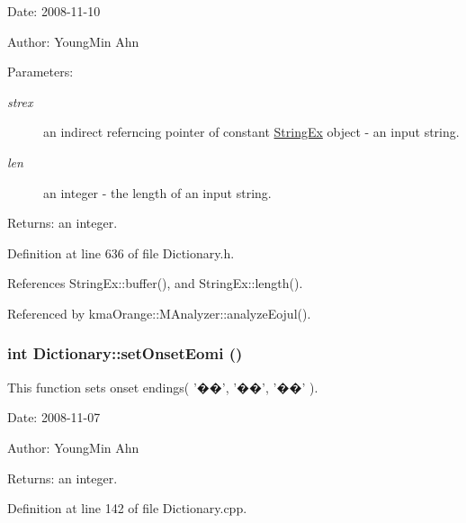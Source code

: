 \begin{Desc}
\item[Date:]2008-11-10 \end{Desc}
\begin{Desc}
\item[Author:]YoungMin Ahn \end{Desc}
\begin{Desc}
\item[Parameters:]
\begin{description}
\item[{\em strex}]an indirect referncing pointer of constant \hyperlink{classStringEx}{StringEx} object - an input string. \item[{\em len}]an integer - the length of an input string. \end{description}
\end{Desc}
\begin{Desc}
\item[Returns:]an integer. \end{Desc}


Definition at line 636 of file Dictionary.h.

References StringEx::buffer(), and StringEx::length().

Referenced by kmaOrange::MAnalyzer::analyzeEojul().\hypertarget{classkmaOrange_1_1Dictionary_899b2e257d771091749463afe6dbeab5}{
\subsubsection[{setOnsetEomi}]{\setlength{\rightskip}{0pt plus 5cm}int Dictionary::setOnsetEomi ()}}
\label{classkmaOrange_1_1Dictionary_899b2e257d771091749463afe6dbeab5}


This function sets onset endings( '��', '��', '��' ). 

\begin{Desc}
\item[Date:]2008-11-07 \end{Desc}
\begin{Desc}
\item[Author:]YoungMin Ahn \end{Desc}
\begin{Desc}
\item[Returns:]an integer. \end{Desc}


Definition at line 142 of file Dictionary.cpp.

